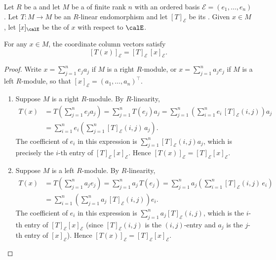 \begin{lemma} \label{lemma:matrix_of_an_endomorphism_acts_on_coordinate_column_vectors}
    Let $R$ be a  and let $M$ be a  of finite rank $n$ with an ordered basis $\mathcal{E} = (e_1,\ldots,e_n)$. Let $T: M \to M$ be an $R$-linear endomorphism and let $[T]_\mathcal{E}$ be its . Given $x \in M$, let $[x]_\calE$ be the  of $x$ with respect to $\calE$.

    For any $x \in M$, the coordinate column vectors satisfy
    $$[T(x)]_\mathcal{E} = [T]_\mathcal{E} \, [x]_\mathcal{E}.$$
\end{lemma}
\begin{proof}
    Write $x = \sum_{j=1}^n e_j a_j$ if $M$ is a right $R$-module, or $x = \sum_{j=1}^n a_j e_j$ if $M$ is a left $R$-module, so that $[x]_\mathcal{E} = (a_1,\ldots,a_n)^\top$.

    \begin{enumerate}
        \item Suppose $M$ is a right $R$-module. By $R$-linearity,
        \begin{align*}
            T(x) &= T\!\left( \sum_{j=1}^n e_j a_j \right)
                  = \sum_{j=1}^n T(e_j) a_j
                  = \sum_{j=1}^n \left( \sum_{i=1}^n e_i \, [T]_\mathcal{E}(i,j) \right) a_j \\
                &= \sum_{i=1}^n e_i \left( \sum_{j=1}^n [T]_\mathcal{E}(i,j) \, a_j \right).
        \end{align*}
        The coefficient of $e_i$ in this expression is $\sum_{j=1}^n [T]_\mathcal{E}(i,j) a_j$, which is precisely the $i$-th entry of $[T]_\mathcal{E} [x]_\mathcal{E}$. Hence $[T(x)]_\mathcal{E} = [T]_\mathcal{E} [x]_\mathcal{E}$.

        \item Suppose $M$ is a left $R$-module. By $R$-linearity,
        \begin{align*}
            T(x) &= T\!\left( \sum_{j=1}^n a_j e_j \right)
                  = \sum_{j=1}^n a_j \, T(e_j)
                  = \sum_{j=1}^n a_j \left( \sum_{i=1}^n [T]_\mathcal{E}(i,j) \, e_i \right) \\
                &= \sum_{i=1}^n \left( \sum_{j=1}^n a_j \, [T]_\mathcal{E}(i,j) \right) e_i.
        \end{align*}
        The coefficient of $e_i$ in this expression is $\sum_{j=1}^n a_j [T]_\mathcal{E}(i,j)$, which is the $i$-th entry of $[T]_\mathcal{E} [x]_\mathcal{E}$ (since $[T]_\mathcal{E}(i,j)$ is the $(i,j)$-entry and $a_j$ is the $j$-th entry of $[x]_\mathcal{E}$). Hence $[T(x)]_\mathcal{E} = [T]_\mathcal{E} [x]_\mathcal{E}$.
    \end{enumerate}
\end{proof}